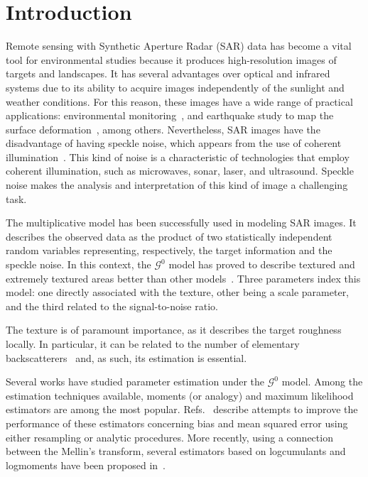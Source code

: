 \documentclass[twocolumn]{svjour3}
\begin{document}
\section{Introduction}
\label{intro}

Remote sensing with Synthetic Aperture Radar (SAR) data has become a vital tool for environmental studies because it produces high-resolution images of targets and landscapes. 
It has several advantages over optical and infrared systems due to its ability to acquire images independently of the sunlight and weather conditions. 
For this reason, these images have a wide range of practical applications: environmental monitoring~\cite{White1991,Brisco2013}, and
earthquake study to map the surface deformation~\cite{Yinghui2017}, among others.  
Nevertheless, SAR images have the disadvantage of having speckle noise, which appears from the use of coherent illumination~\cite{SARImageStatisticalModelingPartISinglePixelStatisticalModels}. 
This kind of noise is a characteristic of technologies that
employ coherent illumination, such as microwaves, sonar, laser, and ultrasound. 
Speckle noise makes the analysis and interpretation of this kind of image a challenging task.

The multiplicative model has been successfully used in modeling SAR images.
It describes the observed data as the product of two statistically independent random variables representing, respectively, the target information and the speckle noise. 
In this context, the $\mathcal{G}^0$ model has proved to describe textured and extremely textured areas better than other models~\cite{Frery97,MejailJacoboFreryBustos:IJRS}. 
Three parameters index this model: 
one directly associated with the texture, 
other being a scale parameter, 
and the third related to the signal-to-noise ratio.

The texture is of paramount importance, as it describes the target roughness locally.
In particular, it can be related to the number of elementary backscatterers~\cite{AGeneralizedGaussianCoherentScattererModelforCorrelatedSARTexture} and, as such, its estimation is essential.

Several works have studied parameter estimation under the $\mathcal{G}^0$ model. 
Among the estimation techniques available, moments (or analogy) and maximum likelihood estimators are among the most popular. 
Refs.~\cite{VasconcellosFrerySilva:CompStat,CribariFrerySilva:CSDA} describe attempts to improve the performance of these estimators concerning bias and mean squared error using either resampling or analytic procedures. More recently, using a connection between the Mellin's transform, several estimators based on logcumulants and logmoments have been proposed in~\cite{MellinAnalysisPolSAR,BujorTrouveValetNicolas2004,khan2014}. 
\end{document}
